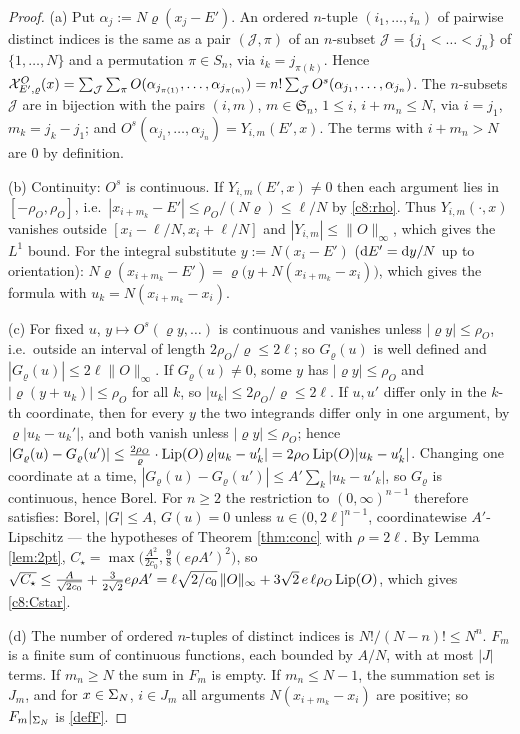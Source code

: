 \begin{proof}
(a) Put $\alpha_j:=N\varrho(x_j-E')$. An ordered $n$-tuple $(i_1,\dots,i_n)$ of pairwise distinct indices is the same as a pair $(\mathcal J,\pi)$ of an $n$-subset $\mathcal J=\{j_1<\dots<j_n\}$ of $\{1,\dots,N\}$ and a permutation $\pi\in S_n$, via $i_k=j_{\pi(k)}$. Hence
$\mathcal{X}^O_{E',\varrho}(x)=\sum_{\mathcal J}\sum_{\pi}O(\alpha_{j_{\pi(1)}},\dots,\alpha_{j_{\pi(n)}})=n!\sum_{\mathcal J}O^s(\alpha_{j_1},\dots,\alpha_{j_n})$.
The $n$-subsets $\mathcal J$ are in bijection with the pairs $(i,m)$, $m\in\mathfrak S_n$, $1\le i$, $i+m_n\le N$, via $i=j_1$, $m_k=j_k-j_1$; and $O^s(\alpha_{j_1},\dots,\alpha_{j_n})=Y_{i,m}(E',x)$. The terms with $i+m_n>N$ are $0$ by definition.

(b) Continuity: $O^s$ is continuous. If $Y_{i,m}(E',x)\ne0$ then each argument lies in $[-\rho_O,\rho_O]$, i.e.\ $|x_{i+m_k}-E'|\le\rho_O/(N\varrho)\le\ell/N$ by \eqref{c8:rho}. Thus $Y_{i,m}(\cdot,x)$ vanishes outside $[x_i-\ell/N,x_i+\ell/N]$ and $|Y_{i,m}|\le\|O\|_\infty$, which gives the $L^1$ bound.
For the integral substitute $y:=N(x_i-E')$ ($\mathrm{d} E'=\mathrm{d} y/N$ up to orientation): $N\varrho(x_{i+m_k}-E')=\varrho\big(y+N(x_{i+m_k}-x_i)\big)$, which gives the formula with $u_k=N(x_{i+m_k}-x_i)$.

(c) For fixed $u$, $y\mapsto O^s(\varrho y,\dots)$ is continuous and vanishes unless $|\varrho y|\le\rho_O$, i.e.\ outside an interval of length $2\rho_O/\varrho\le2\ell$; so $G_\varrho(u)$ is well defined and $|G_\varrho(u)|\le2\ell\|O\|_\infty$.
If $G_\varrho(u)\ne0$, some $y$ has $|\varrho y|\le\rho_O$ and $|\varrho(y+u_k)|\le\rho_O$ for all $k$, so $|u_k|\le2\rho_O/\varrho\le2\ell$.
If $u,u'$ differ only in the $k$-th coordinate, then for every $y$ the two integrands differ only in one argument, by $\varrho|u_k-u_k'|$, and both vanish unless $|\varrho y|\le\rho_O$; hence
$|G_\varrho(u)-G_\varrho(u')|\le\frac{2\rho_O}{\varrho}\cdot\operatorname{Lip}(O)\,\varrho|u_k-u_k'|=2\rho_O\operatorname{Lip}(O)|u_k-u_k'|$.
Changing one coordinate at a time, $|G_\varrho(u)-G_\varrho(u')|\le A'\sum_k|u_k-u'_k|$, so $G_\varrho$ is continuous, hence Borel.
For $n\ge2$ the restriction to $(0,\infty)^{n-1}$ therefore satisfies: Borel, $|G|\le A$, $G(u)=0$ unless $u\in(0,2\ell]^{n-1}$, coordinatewise $A'$-Lipschitz — the hypotheses of Theorem \ref{thm:conc} with $\rho=2\ell$.
By Lemma \ref{lem:2pt}, $C_\star=\max\big(\frac{A^2}{2c_0},\frac98(e\rho A')^2\big)$, so $\sqrt{C_\star}\le\frac{A}{\sqrt{2c_0}}+\frac{3}{2\sqrt2}e\rho A'=\ell\sqrt{2/c_0}\,\|O\|_\infty+3\sqrt2\,e\,\ell\rho_O\operatorname{Lip}(O)$, which gives \eqref{c8:Cstar}.

(d) The number of ordered $n$-tuples of distinct indices is $N!/(N-n)!\le N^n$. $F_m$ is a finite sum of continuous functions, each bounded by $A/N$, with at most $|J|$ terms. If $m_n\ge N$ the sum in $F_m$ is empty. If $m_n\le N-1$, the summation set is $J_m$, and for $x\in\Sigma_N$, $i\in J_m$ all arguments $N(x_{i+m_k}-x_i)$ are positive; so $F_m|_{\Sigma_N}$ is \eqref{defF}.
\end{proof}


